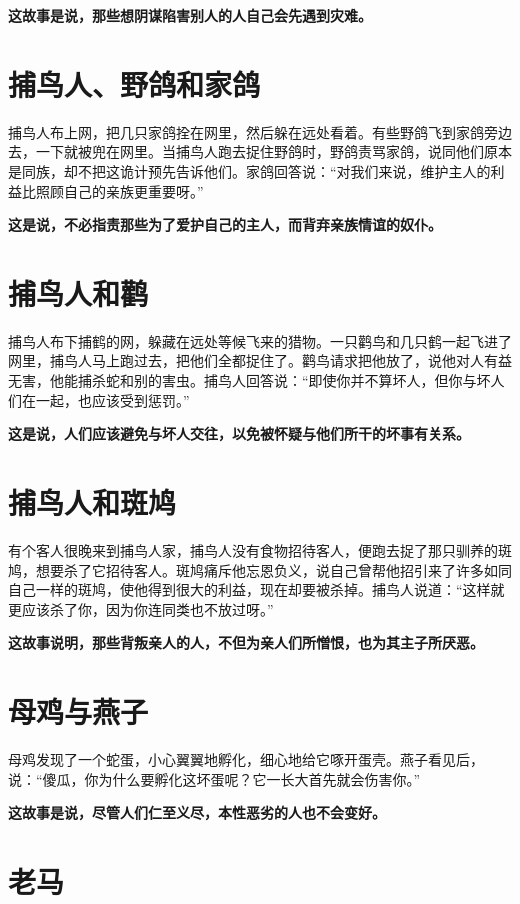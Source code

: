 {\bfseries \color{red}这故事是说，那些想阴谋陷害别人的人自己会先遇到灾难。}

\section{捕鸟人、野鸽和家鸽}

捕鸟人布上网，把几只家鸽拴在网里，然后躲在远处看着。有些野鸽飞到家鸽旁边去，一下就被兜在网里。当捕鸟人跑去捉住野鸽时，野鸽责骂家鸽，说同他们原本是同族，却不把这诡计预先告诉他们。家鸽回答说：“对我们来说，维护主人的利益比照顾自己的亲族更重要呀。”

{\bfseries \color{red}这是说，不必指责那些为了爱护自己的主人，而背弃亲族情谊的奴仆。}

\section{捕鸟人和鹳}

捕鸟人布下捕鹤的网，躲藏在远处等候飞来的猎物。一只鹳鸟和几只鹤一起飞进了网里，捕鸟人马上跑过去，把他们全都捉住了。鹳鸟请求把他放了，说他对人有益无害，他能捕杀蛇和别的害虫。捕鸟人回答说：“即使你并不算坏人，但你与坏人们在一起，也应该受到惩罚。”

{\bfseries \color{red}这是说，人们应该避免与坏人交往，以免被怀疑与他们所干的坏事有关系。}

\section{捕鸟人和斑鸠}

有个客人很晚来到捕鸟人家，捕鸟人没有食物招待客人，便跑去捉了那只驯养的斑鸠，想要杀了它招待客人。斑鸠痛斥他忘恩负义，说自己曾帮他招引来了许多如同自己一样的斑鸠，使他得到很大的利益，现在却要被杀掉。捕鸟人说道：“这样就更应该杀了你，因为你连同类也不放过呀。”

{\bfseries \color{red}这故事说明，那些背叛亲人的人，不但为亲人们所憎恨，也为其主子所厌恶。}

\section{母鸡与燕子}

母鸡发现了一个蛇蛋，小心翼翼地孵化，细心地给它啄开蛋壳。燕子看见后，说：“傻瓜，你为什么要孵化这坏蛋呢？它一长大首先就会伤害你。”

{\bfseries \color{red}这故事是说，尽管人们仁至义尽，本性恶劣的人也不会变好。}

\section{老马}


